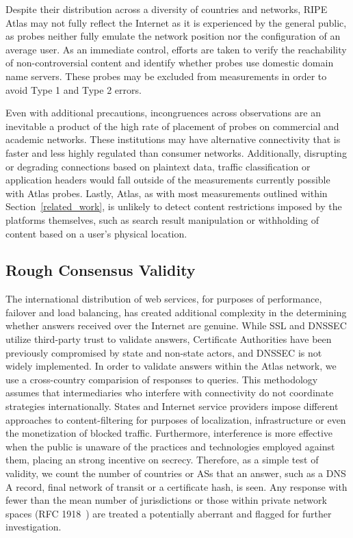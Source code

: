 Despite their distribution across a diversity of countries and networks, RIPE Atlas may not fully reflect the Internet as it is experienced by the general public, as probes neither fully emulate the network position nor the configuration of an average user. As an immediate control, efforts are taken to verify the reachability of non-controversial content and identify whether probes use domestic domain name servers. These probes may be excluded from measurements in order to avoid Type 1 and Type 2 errors.

Even with additional precautions, incongruences across observations are an inevitable a product of the high rate of placement of probes on commercial and academic networks. These institutions may have alternative connectivity that is faster and less highly regulated than consumer networks. Additionally, disrupting or degrading connections based on plaintext data, traffic classification or application headers would fall outside of the measurements currently possible with Atlas probes. Lastly, Atlas, as with most measurements outlined within Section~\ref{related_work}, is unlikely to detect content restrictions imposed by the platforms themselves, such as search result manipulation or withholding of content based on a user's physical location.

\subsection{Rough Consensus Validity}

The international distribution of web services, for purposes of performance, failover and load balancing, has created additional complexity in the determining whether answers received over the Internet are genuine. While SSL and DNSSEC utilize third-party trust to validate answers, Certificate Authorities have been previously compromised by state and non-state actors, and DNSSEC is not widely implemented. In order to validate answers within the Atlas network, we use a cross-country comparision of responses to queries. This methodology assumes that intermediaries who interfere with connectivity do not coordinate strategies internationally. States and Internet service providers impose different approaches to content-filtering for purposes of localization, infrastructure or even the monetization of blocked traffic. Furthermore, interference is more effective when the public is unaware of the practices and technologies employed against them, placing an strong incentive on secrecy. Therefore, as a simple test of validity, we count the number of countries or ASs that an answer, such as a DNS A record, final network of transit or a certificate hash, is seen. Any response with fewer than the mean number of jurisdictions or those within private network spaces (RFC 1918~\cite{rfc1918}) are treated a potentially aberrant and flagged for further investigation.

